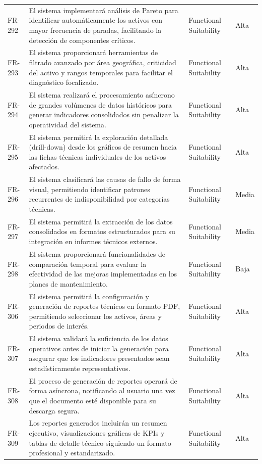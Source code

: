 \begin{longtable}{>{\raggedright\arraybackslash}p{} >{\raggedright\arraybackslash}p{} >{\raggedright\arraybackslash}p{} >{\raggedright\arraybackslash}p{}}
FR-292 & El sistema implementará análisis de Pareto para identificar automáticamente los activos con mayor frecuencia de paradas, facilitando la detección de componentes críticos. & Functional Suitability & Alta \\
FR-293 & El sistema proporcionará herramientas de filtrado avanzado por área geográfica, criticidad del activo y rangos temporales para facilitar el diagnóstico focalizado. & Functional Suitability & Alta \\
FR-294 & El sistema realizará el procesamiento asíncrono de grandes volúmenes de datos históricos para generar indicadores consolidados sin penalizar la operatividad del sistema. & Functional Suitability & Alta \\
FR-295 & El sistema permitirá la exploración detallada (drill-down) desde los gráficos de resumen hacia las fichas técnicas individuales de los activos afectados. & Functional Suitability & Alta \\
FR-296 & El sistema clasificará las causas de fallo de forma visual, permitiendo identificar patrones recurrentes de indisponibilidad por categorías técnicas. & Functional Suitability & Media \\
FR-297 & El sistema permitirá la extracción de los datos consolidados en formatos estructurados para su integración en informes técnicos externos. & Functional Suitability & Media \\
FR-298 & El sistema proporcionará funcionalidades de comparación temporal para evaluar la efectividad de las mejoras implementadas en los planes de mantenimiento. & Functional Suitability & Baja \\
FR-306 & El sistema permitirá la configuración y generación de reportes técnicos en formato PDF, permitiendo seleccionar los activos, áreas y periodos de interés. & Functional Suitability & Alta \\
FR-307 & El sistema validará la suficiencia de los datos operativos antes de iniciar la generación para asegurar que los indicadores presentados sean estadísticamente representativos. & Functional Suitability & Alta \\
FR-308 & El proceso de generación de reportes operará de forma asíncrona, notificando al usuario una vez que el documento esté disponible para su descarga segura. & Functional Suitability & Alta \\
FR-309 & Los reportes generados incluirán un resumen ejecutivo, visualizaciones gráficas de KPIs y tablas de detalle técnico siguiendo un formato profesional y estandarizado. & Functional Suitability & Alta \\

\end{longtable}
